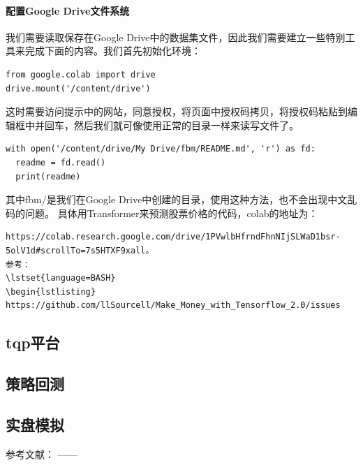 \documentclass{article}
\begin{document}
\paragraph{配置Google Drive文件系统}
我们需要读取保存在Google Drive中的数据集文件，因此我们需要建立一些特别工具来完成下面的内容。我们首先初始化环境：
\begin{lstlisting}
from google.colab import drive
drive.mount('/content/drive')
\end{lstlisting}
这时需要访问提示中的网站，同意授权，将页面中授权码拷贝，将授权码粘贴到编辑框中并回车，然后我们就可像使用正常的目录一样来读写文件了。
\begin{lstlisting}
with open('/content/drive/My Drive/fbm/README.md', 'r') as fd:
  readme = fd.read()
  print(readme)
\end{lstlisting}
其中fbm/是我们在Google Drive中创建的目录，使用这种方法，也不会出现中文乱码的问题。
具体用Transformer来预测股票价格的代码，colab的地址为：
\lstset{language=BASH}
\begin{lstlisting}
https://colab.research.google.com/drive/1PVwlbHfrndFhnNIjSLWaD1bsr-5olV1d#scrollTo=7s5HTXF9xall。
参考：
\lstset{language=BASH}
\begin{lstlisting}
https://github.com/llSourcell/Make_Money_with_Tensorflow_2.0/issues
\end{lstlisting}
\subsection{tqp平台}
\subsection{策略回测}
\subsection{实盘模拟}



参考文献：
\cite{ex1}---\cite{ex2}---\cite{refa001}

\newpage




\appendix
\end{document}

